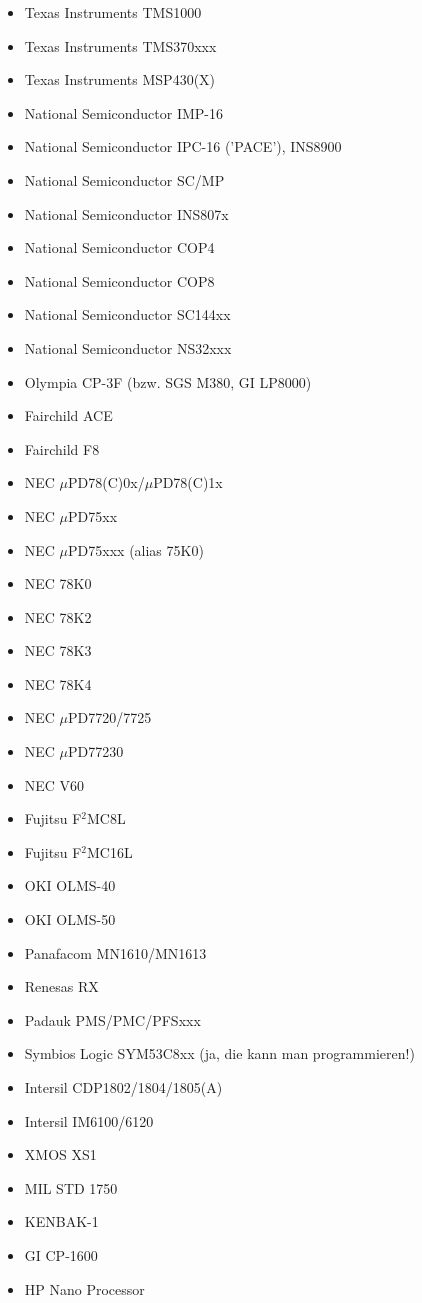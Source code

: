 \documentclass[12pt,a4paper,twoside]{report}
\begin{document}
\begin{itemize}
\item{Texas Instruments TMS1000}
\item{Texas Instruments TMS370xxx}
\item{Texas Instruments MSP430(X)}
\item{National Semiconductor IMP-16}
\item{National Semiconductor IPC-16 ('PACE'), INS8900}
\item{National Semiconductor SC/MP}
\item{National Semiconductor INS807x}
\item{National Semiconductor COP4}
\item{National Semiconductor COP8}
\item{National Semiconductor SC144xx}
\item{National Semiconductor NS32xxx}
\item{Olympia CP-3F (bzw. SGS M380, GI LP8000)}
\item{Fairchild ACE}
\item{Fairchild F8}
\item{NEC $\mu$PD78(C)0x/$\mu$PD78(C)1x}
\item{NEC $\mu$PD75xx}
\item{NEC $\mu$PD75xxx (alias 75K0)}
\item{NEC 78K0}
\item{NEC 78K2}
\item{NEC 78K3}
\item{NEC 78K4}
\item{NEC $\mu$PD7720/7725}
\item{NEC $\mu$PD77230}
\item{NEC V60}
\item{Fujitsu F$^2$MC8L}
\item{Fujitsu F$^2$MC16L}
\item{OKI OLMS-40}
\item{OKI OLMS-50}
\item{Panafacom MN1610/MN1613}
\item{Renesas RX}
\item{Padauk PMS/PMC/PFSxxx}
\item{Symbios Logic SYM53C8xx (ja, die kann man programmieren!)}
\item{Intersil CDP1802/1804/1805(A)}
\item{Intersil IM6100/6120}
\item{XMOS XS1}
\item{MIL STD 1750}
\item{KENBAK-1}
\item{GI CP-1600}
\item{HP Nano Processor}
\end{itemize}
\end{document}
